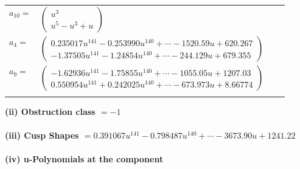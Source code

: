 \documentclass[1p]{elsarticle_modified}
\theoremstyle{definition}
\begin{document}
\begin{tabular}{m{7pt} m{180pt} m{7pt} m{180pt} }
\flushright $a_{10}=$&$\begin{pmatrix}u^3\\u^5- u^3+u\end{pmatrix}$ \\
\flushright $a_{4}=$&$\begin{pmatrix}0.235017 u^{141}-0.253990 u^{140}+\cdots-1520.59 u+620.267\\-1.37505 u^{141}-1.24854 u^{140}+\cdots-244.129 u+679.355\end{pmatrix}$ \\
\flushright $a_{9}=$&$\begin{pmatrix}-1.62936 u^{141}-1.75855 u^{140}+\cdots-1055.05 u+1207.03\\0.550954 u^{141}+0.242025 u^{140}+\cdots-673.973 u+8.66774\end{pmatrix}$\\&\end{tabular}
\flushleft \textbf{(ii) Obstruction class $= -1$}\\~\\
\flushleft \textbf{(iii) Cusp Shapes $= 0.391067 u^{141}-0.798487 u^{140}+\cdots-3673.90 u+1241.22$}\\~\\
\newpage\renewcommand{\arraystretch}{1}
\flushleft \textbf{(iv) u-Polynomials at the component}\newline \\
\end{document}
